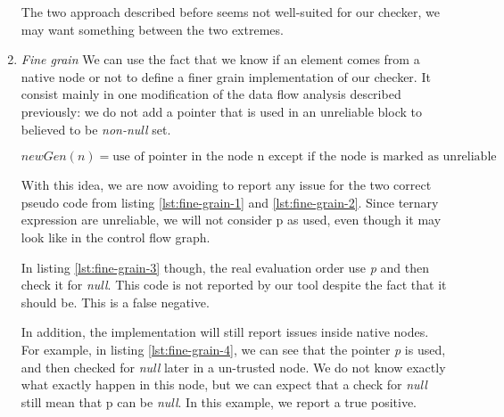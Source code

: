 \begin{enumerate}
The two approach described before seems not well-suited for our checker, we may want something between the two extremes.

\item \textit{Fine grain} \newline
We can use the fact that we know if an element comes from a native node or not to define a finer grain implementation of our checker. 
It consist mainly in one modification of the data flow analysis described previously: we do not add a pointer that is used in an unreliable block to believed to be \emph{non-null} set.

\begin{equation}\label{eqn:new_dataflow4}
newGen(n) = \text{use of pointer in the node n except if the node is marked as unreliable}
\end{equation}





With this idea, we are now avoiding to report any issue for the two correct pseudo code from listing \ref{lst:fine-grain-1} and \ref{lst:fine-grain-2}. Since ternary expression are unreliable, we will not consider p as used, even though it may look like in the control flow graph.



In listing \ref{lst:fine-grain-3} though, the real evaluation order use \emph{p} and then check it for \emph{null}. This code is not reported by our tool despite the fact that it should be. This is a false negative.\newline



In addition, the implementation will  still report issues inside native nodes.
For example, in listing \ref{lst:fine-grain-4}, we can see that the pointer \emph{p} is used, and then checked for \emph{null} later in a un-trusted node. We do not know exactly what exactly happen in this node, but we can expect that a check for \emph{null} still mean that p can be \emph{null}. 
In this example, we report a true positive.
\end{enumerate}


